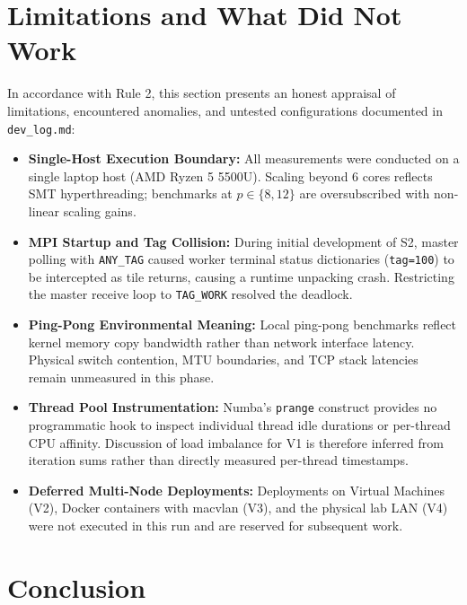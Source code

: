 \documentclass[11pt,a4paper]{article}
\begin{document}
\section{Limitations and What Did Not Work}
\label{sec:limitations}

In accordance with Rule 2, this section presents an honest appraisal of limitations, encountered anomalies, and untested configurations documented in \texttt{dev\_log.md}:
\begin{itemize}
    \item \textbf{Single-Host Execution Boundary:} All measurements were conducted on a single laptop host (AMD Ryzen 5 5500U). Scaling beyond 6 cores reflects SMT hyperthreading; benchmarks at $p \in \{8, 12\}$ are oversubscribed with non-linear scaling gains.
    \item \textbf{MPI Startup and Tag Collision:} During initial development of S2, master polling with \texttt{ANY\_TAG} caused worker terminal status dictionaries (\texttt{tag=100}) to be intercepted as tile returns, causing a runtime unpacking crash. Restricting the master receive loop to \texttt{TAG\_WORK} resolved the deadlock.
    \item \textbf{Ping-Pong Environmental Meaning:} Local ping-pong benchmarks reflect kernel memory copy bandwidth rather than network interface latency. Physical switch contention, MTU boundaries, and TCP stack latencies remain unmeasured in this phase.
    \item \textbf{Thread Pool Instrumentation:} Numba's \texttt{prange} construct provides no programmatic hook to inspect individual thread idle durations or per-thread CPU affinity. Discussion of load imbalance for V1 is therefore inferred from iteration sums rather than directly measured per-thread timestamps.
    \item \textbf{Deferred Multi-Node Deployments:} Deployments on Virtual Machines (V2), Docker containers with macvlan (V3), and the physical lab LAN (V4) were not executed in this run and are reserved for subsequent work.
\end{itemize}

\section{Conclusion}
\label{sec:conclusion}
\end{document}

